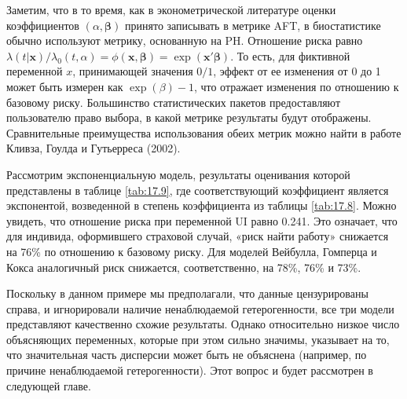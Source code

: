 Заметим, что в то время, как в эконометрической литературе оценки коэффициентов $(\alpha,\bm{\beta})$ принято записывать в метрике AFT, в биостатистике обычно используют метрику, основанную на PH. Отношение риска равно $\lambda(t|\mathbf{x})/\lambda_0(t,\alpha)=\phi(\mathbf{x},\bm{\beta})=\exp(\mathbf{x}'\bm{\beta})$. То есть, для фиктивной переменной $x$, принимающей значения $0/1$, эффект от ее изменения от 0 до 1 может быть измерен как $\exp(\beta)-1$, что отражает изменения по отношению к базовому риску. Большинство статистических пакетов предоставляют пользователю право выбора, в какой метрике результаты будут отображены. Сравнительные преимущества использования обеих метрик можно найти в работе Кливза, Гоулда и Гутьерреса (2002).

Рассмотрим экспоненциальную модель, результаты оценивания которой представлены в таблице \ref{tab:17.9}, где соответствующий коэффициент является экспонентой, возведенной в степень коэффициента из таблицы \ref{tab:17.8}. Можно увидеть, что отношение риска при переменной UI равно 0.241. Это означает, что для индивида, оформившего страховой случай, «риск найти работу» снижается на 76\% по отношению к базовому риску. Для моделей Вейбулла, Гомперца и Кокса аналогичный риск снижается, соответственно, на 78\%, 76\% и 73\%.

Поскольку в данном примере мы предполагали, что данные цензурированы справа, и игнорировали наличие ненаблюдаемой гетерогенности, все три модели представляют качественно схожие результаты. Однако относительно низкое число объясняющих переменных, которые при этом сильно значимы, указывает на то, что значительная часть дисперсии может быть не объяснена (например, по причине ненаблюдаемой гетерогенности). Этот вопрос и будет рассмотрен в следующей главе.


